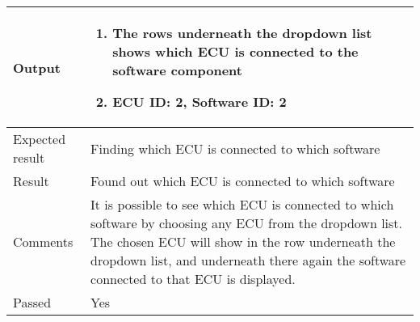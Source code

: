 \begin{table}[H]
\begin{tabularx}{1.0\textwidth}{
    |p{}     %
    |p{}|    %
}
Output
& \begin{enumerate}
    \item The rows underneath the dropdown list shows which ECU is connected to the software component
    \item ECU ID: 2, Software ID: 2
\end{enumerate}
\\
\hline

Expected result
& Finding which ECU is connected to which software
\\
\hline

Result
& Found out which ECU is connected to which software
\\
\hline

Comments
& It is possible to see which ECU is connected to which software by choosing any ECU from the dropdown list. The chosen ECU will show in the row underneath the dropdown list, and underneath there again the software connected to that ECU is displayed. 
\\
\hline

Passed
& Yes
\\
\hline

\end{tabularx}
\end{table}

